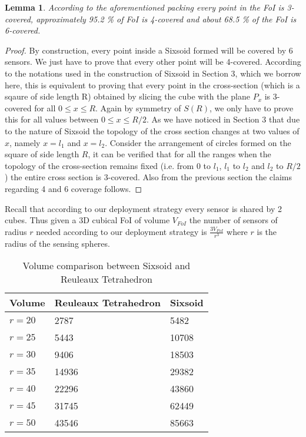 \documentclass[conference]{IEEEtran}
\newtheorem{lemma}{Lemma}
\begin{document}
\begin{lemma}
According to the aforementioned packing every point in the FoI is 3-covered, approximately 
95.2 \% of FoI is 4-covered and about 68.5 \% of the FoI is 6-covered. 
\end{lemma}
\begin{proof}
By construction, every point inside a Sixsoid
formed will be covered by 6 sensors. We just have to
prove that every other point will be 4-covered. According
to the notations used in the construction of Sixsoid
in Section 3, which we borrow here, this is equivalent to
proving that every point in the cross-section (which is
a sqaure of side length R) obtained by slicing the cube
with the plane $P_x$ is 3-covered for all $0 \leq x \leq R$. Again
by symmetry of $S(R)$, we only have to prove this for
all values between $0 \leq x \leq R/2$. As we have noticed in
Section 3 that due to the nature of Sixsoid the topology
of the cross section changes at two values of $x$, namely
$x = l_1$ and $x = l_2$. Consider the arrangement of circles
formed on the square of side length $R$, it can be verified that for
all the ranges when the topology of the cross-section remains fixed
(i.e. from 0 to $l_1$, $l_1$ to $l_2$ and $l_2$ to $R/2$) the entire cross
section is 3-covered. Also from the previous section the claims regarding 
4 and 6 coverage follows.
\end{proof}

Recall that according to our deployment strategy every sensor is
shared by 2 cubes. Thus given a 3D cubical FoI of volume $V_{FoI}$ the number of sensors of radius $r$ needed according
to our deployment strategy is $\frac{3V_{FoI}}{r^3}$ where $r$ is the radius of the sensing 
spheres. 

\begin{table}
\small
 \caption{Volume comparison between Sixsoid and Reuleaux Tetrahedron}
\label{t2}
\begin{center}
    \begin{tabular}{ | l | l | l |}
    \hline
    Volume   & Reuleaux Tetrahedron & Sixsoid  \\ \hline
    $r = 20$  &2787 &  5482   \\ \hline          
    $r = 25$  &5443 & 10708  \\ \hline
    $r = 30$  & 9406 & 18503  \\ \hline
    $r = 35$  &14936 & 29382  \\ \hline
    $r = 40$  &22296 & 43860  \\ \hline
    $r = 45$  &31745 & 62449  \\ \hline
    $r = 50$  &43546 & 85663   \\ \hline
    \end{tabular}
\end{center}
\end{table}	
\end{document}
